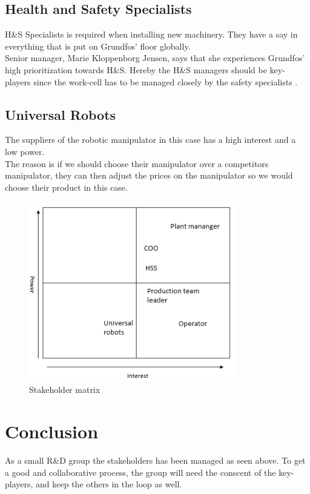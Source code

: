 \subsection{Health and Safety Specialists}\label{ch:SafetyPersonel} 

H\&S Specialists is required when installing new machinery. They have a say in everything that is put on Grundfos' floor globally.\\ 
Senior manager, Marie Kloppenborg Jensen, says that she experiences Grundfos' high prioritization towards H\&S. Hereby the H\&S managers should be key-players since the work-cell has to be managed closely by the safety specialists \cite{H&S}.\\ 

\subsection{Universal Robots}\label{ch:Universalrobots-stake}
The suppliers of the robotic manipulator in this case has a high interest and a low power.\\The reason is if we should choose their manipulator over a competitors manipulator, they can then adjust the prices on the manipulator so we would choose their product in this case. \\ 

\begin{figure}[h]
    \centering
     \includegraphics[width=9cm]{StakeholderAnalysis/matrix.PNG}
    \caption{Stakeholder matrix}
    \label{fig:Stackholder matrix}
\end{figure}

\section{Conclusion}
As a small R\&D group the stakeholders has been managed as seen above. To get a good and collaborative process, the group will need the conscent of the key-players, and keep the others in the loop as well. 

